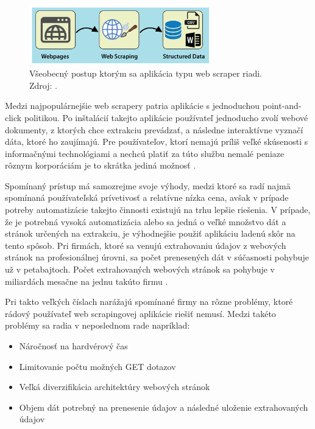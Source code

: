 \begin{figure}[hbt]
	\centering
	\includegraphics[width=0.7\textwidth]{obrazky-figures/web-scraping-using-python.png}
	\caption{Všeobecný postup ktorým sa aplikácia typu web scraper riadi. Zdroj: \cite{WebScrap}.}
	\label{WebScrap_img}
\end{figure}

\bigskip

Medzi najpopulárnejšie web scrapery patria aplikácie s jednoduchou point-and-click politikou. Po inštalácií takejto aplikácie používateľ jednoducho zvolí webové dokumenty, z ktorých chce extrakciu prevádzať, a následne interaktívne vyznačí dáta, ktoré ho zaujímajú. Pre používateľov, ktorí nemajú príliš veľké skúsenosti s informačnými technológiami a nechcú platiť za túto službu nemalé peniaze rôznym korporáciám je to skrátka jediná možnosť \cite{scrapers}.

\bigskip

Spomínaný prístup má samozrejme svoje výhody, medzi ktoré sa radí najmä spomínaná používateľská prívetivosť a relatívne nízka cena, avšak v prípade potreby automatizácie takejto činnosti existujú na trhu lepšie riešenia. V prípade, že je potrebná vysoká automatizácia alebo sa jedná o veľké množstvo dát a stránok určených na extrakciu, je výhodnejšie použiť aplikáciu ladenú skôr na tento spôsob. Pri firmách, ktoré sa venujú extrahovaniu údajov z webových stránok na profesionálnej úrovni, sa počet prenesených dát v súčasnosti pohybuje už v petabajtoch. Počet extrahovaných webových stránok sa pohybuje v miliardách mesačne na jednu takúto firmu \cite{JanCurna:online}.

Pri takto veľkých číslach narážajú spomínané firmy na rôzne problémy, ktoré rádový používateľ web scrapingovej aplikácie riešiť nemusí. Medzi takéto problémy sa radia v neposlednom rade napríklad:
\begin{itemize}
    \item {Náročnosť na hardvérový čas}
    \item {Limitovanie počtu možných GET dotazov}
    \item {Veľká diverzifikácia architektúry webových stránok}
    \item {Objem dát potrebný na prenesenie údajov a následné uloženie extrahovaných údajov}
\end{itemize}

